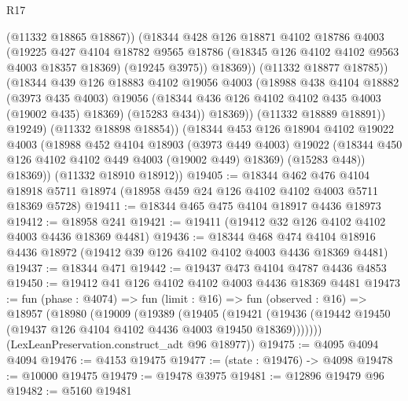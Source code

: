 \begin{lexlean}{R17}
\begin{coremodule}
                      (@11332 @18865 @18867))
                    (@18344
                      @428
                      @126
                      @18871
                      @4102
                      @18786
                      @4003
                      (@19225
                        @427
                        @4104
                        @18782
                        @9565
                        @18786
                        (@18345 @126 @4102 @4102 @9563 @4003 @18357 @18369)
                        (@19245 @3975))
                      @18369))
                  (@11332 @18877 @18785))
                (@18344
                  @439
                  @126
                  @18883
                  @4102
                  @19056
                  @4003
                  (@18988
                    @438
                    @4104
                    @18882
                    (@3973 @435 @4003)
                    @19056
                    (@18344 @436 @126 @4102 @4102 @435 @4003 (@19002 @435) @18369)
                    (@15283 @434))
                  @18369))
              (@11332 @18889 @18891))
            @19249)
          (@11332 @18898 @18854))
        (@18344
          @453
          @126
          @18904
          @4102
          @19022
          @4003
          (@18988
            @452
            @4104
            @18903
            (@3973 @449 @4003)
            @19022
            (@18344 @450 @126 @4102 @4102 @449 @4003 (@19002 @449) @18369)
            (@15283 @448))
          @18369))
      (@11332 @18910 @18912))
@19405 := @18344
    @462
    @476
    @4104
    @18918
    @5711
    @18974
    (@18958 @459 @24 @126 @4102 @4102 @4003 @5711 @18369 @5728)
@19411 := @18344 @465 @475 @4104 @18917 @4436 @18973
@19412 := @18958 @241
@19421 := @19411 (@19412 @32 @126 @4102 @4102 @4003 @4436 @18369 @4481)
@19436 := @18344
    @468
    @474
    @4104
    @18916
    @4436
    @18972
    (@19412 @39 @126 @4102 @4102 @4003 @4436 @18369 @4481)
@19437 := @18344 @471
@19442 := @19437 @473 @4104 @4787 @4436 @4853
@19450 := @19412 @41 @126 @4102 @4102 @4003 @4436 @18369 @4481
@19473 := fun (phase : @4074) =>
  fun (limit : @16) =>
  fun (observed : @16) =>
  @18957
    (@18980
      (@19009
        (@19389
          (@19405
            (@19421 (@19436 (@19442 @19450 (@19437 @126 @4104 @4102 @4436 @4003 @19450 @18369)))))))
      (LexLeanPreservation.construct_adt @96 @18977))
@19475 := @4095 @4094 @4094
@19476 := @4153 @19475
@19477 := (state : @19476) -> @4098
@19478 := @10000 @19475
@19479 := @19478 @3975
@19481 := @12896 @19479 @96
@19482 := @5160 @19481

\end{coremodule}
\end{lexlean}
